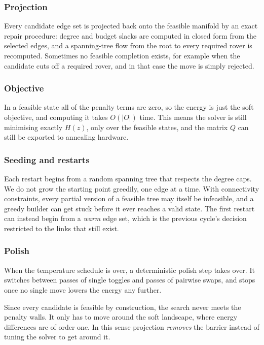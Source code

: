 \subsubsection{Projection} Every candidate edge set is projected back onto
the feasible manifold by an exact repair procedure: degree and budget slacks
are computed in closed form from the selected edges, and a spanning-tree flow
from the root to every required rover is recomputed. Sometimes no feasible
completion exists, for example when the candidate cuts off a required rover,
and in that case the move is simply rejected.

\subsubsection{Objective} In a feasible state all of the penalty terms are
zero, so the energy is just the soft objective, and computing it takes
$O(|O|)$ time. This means the solver is still minimising exactly $H(z)$, only
over the feasible states, and the matrix $Q$ can still be exported to
annealing hardware.

\subsubsection{Seeding and restarts} Each restart begins from a random
spanning tree that respects the degree caps. We do not grow the starting point
greedily, one edge at a time. With connectivity constraints, every partial
version of a feasible tree may itself be infeasible, and a greedy builder can
get stuck before it ever reaches a valid state. The first restart can instead
begin from a \emph{warm} edge set, which is the previous cycle's decision
restricted to the links that still exist.

\subsubsection{Polish} When the temperature schedule is over, a deterministic
polish step takes over. It switches between passes of single toggles and
passes of pairwise swaps, and stops once no single move lowers the energy any
further.

Since every candidate is feasible by construction, the search never meets the
penalty walls. It only has to move around the soft landscape, where energy
differences are of order one. In this sense projection \emph{removes} the
barrier instead of tuning the solver to get around it.

